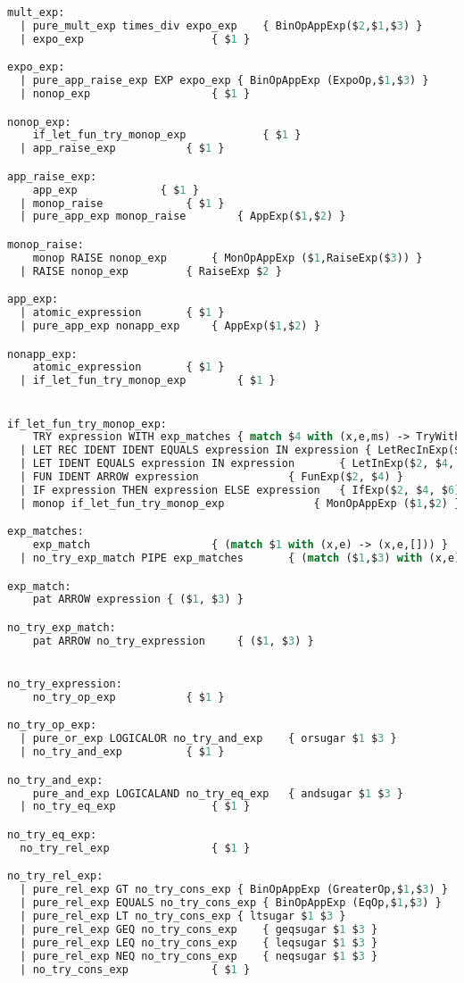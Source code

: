 \begin{lstlisting}[language=Caml, caption=tailRecPicoMLparse.mly]
mult_exp:
  | pure_mult_exp times_div expo_exp 	{ BinOpAppExp($2,$1,$3) }
  | expo_exp	       			{ $1 }

expo_exp:
  | pure_app_raise_exp EXP expo_exp	{ BinOpAppExp (ExpoOp,$1,$3) }
  | nonop_exp	       	   		{ $1 }

nonop_exp:
    if_let_fun_try_monop_exp			{ $1 }
  | app_raise_exp			{ $1 }

app_raise_exp:
    app_exp				{ $1 }
  | monop_raise				{ $1 }
  | pure_app_exp monop_raise		{ AppExp($1,$2) }

monop_raise:
    monop RAISE nonop_exp		{ MonOpAppExp ($1,RaiseExp($3)) }
  | RAISE nonop_exp			{ RaiseExp $2 }

app_exp:
  | atomic_expression		{ $1 }
  | pure_app_exp nonapp_exp 	{ AppExp($1,$2) }

nonapp_exp:
    atomic_expression		{ $1 }
  | if_let_fun_try_monop_exp		{ $1 }


if_let_fun_try_monop_exp:
    TRY expression WITH exp_matches	{ match $4 with (x,e,ms) -> TryWithExp ($2, x,e, ms) }
  | LET REC IDENT IDENT EQUALS expression IN expression	{ LetRecInExp($3, $4, $6, $8) }
  | LET IDENT EQUALS expression IN expression		{ LetInExp($2, $4, $6) }
  | FUN IDENT ARROW expression				{ FunExp($2, $4) }
  | IF expression THEN expression ELSE expression	{ IfExp($2, $4, $6) }
  | monop if_let_fun_try_monop_exp     			{ MonOpAppExp ($1,$2) }

exp_matches:
    exp_match					{ (match $1 with (x,e) -> (x,e,[])) }
  | no_try_exp_match PIPE exp_matches		{ (match ($1,$3) with (x,e),(y,f,l) -> (x,e,((y,f)::l))) }

exp_match:
    pat ARROW expression { ($1, $3) }

no_try_exp_match:
    pat ARROW no_try_expression		{ ($1, $3) }


no_try_expression:
    no_try_op_exp			{ $1 }

no_try_op_exp:
  | pure_or_exp LOGICALOR no_try_and_exp	{ orsugar $1 $3 }
  | no_try_and_exp	   		{ $1 }

no_try_and_exp:
    pure_and_exp LOGICALAND no_try_eq_exp	{ andsugar $1 $3 }
  | no_try_eq_exp	     		{ $1 }

no_try_eq_exp:
  no_try_rel_exp     			{ $1 }

no_try_rel_exp:
  | pure_rel_exp GT no_try_cons_exp	{ BinOpAppExp (GreaterOp,$1,$3) }
  | pure_rel_exp EQUALS no_try_cons_exp	{ BinOpAppExp (EqOp,$1,$3) }
  | pure_rel_exp LT no_try_cons_exp	{ ltsugar $1 $3 }
  | pure_rel_exp GEQ no_try_cons_exp	{ geqsugar $1 $3 }
  | pure_rel_exp LEQ no_try_cons_exp	{ leqsugar $1 $3 }
  | pure_rel_exp NEQ no_try_cons_exp	{ neqsugar $1 $3 }
  | no_try_cons_exp    			{ $1 }


\end{lstlisting}

